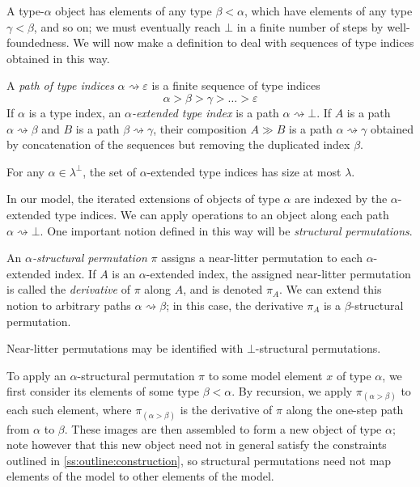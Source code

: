 A type-\( \alpha \) object has elements of any type \( \beta < \alpha \), which have elements of any type \( \gamma < \beta \), and so on; we must eventually reach \( \bot \) in a finite number of steps by well-foundedness.
We will now make a definition to deal with sequences of type indices obtained in this way.
\begin{definition}
    A \emph{path of type indices} \( \alpha \rightsquigarrow \varepsilon \) is a finite sequence of type indices
    \[ \alpha > \beta > \gamma > \dots > \varepsilon \]
    If \( \alpha \) is a type index, an \emph{\( \alpha \)-extended type index} is a path \( \alpha \rightsquigarrow \bot \).
    If \( A \) is a path \( \alpha \rightsquigarrow \beta \) and \( B \) is a path \( \beta \rightsquigarrow \gamma \), their composition \( A \gg B \) is a path \( \alpha \rightsquigarrow \gamma \) obtained by concatenation of the sequences but removing the duplicated index \( \beta \).
\end{definition}
\begin{remark}
    \label{rk:mk_extended_index}
    For any \( \alpha \in \lambda^\bot \), the set of \( \alpha \)-extended type indices has size at most \( \lambda \).
\end{remark}
In our model, the iterated extensions of objects of type \( \alpha \) are indexed by the \( \alpha \)-extended type indices.
We can apply operations to an object along each path \( \alpha \rightsquigarrow \bot \).
One important notion defined in this way will be \emph{structural permutations}.
\begin{definition}
    An \emph{\( \alpha \)-structural permutation} \( \pi \) assigns a near-litter permutation to each \( \alpha \)-extended index.
    If \( A \) is an \( \alpha \)-extended index, the assigned near-litter permutation is called the \emph{derivative} of \( \pi \) along \( A \), and is denoted \( \pi_A \).
    We can extend this notion to arbitrary paths \( \alpha \rightsquigarrow \beta \); in this case, the derivative \( \pi_A \) is a \( \beta \)-structural permutation.
\end{definition}
\begin{remark}
    Near-litter permutations may be identified with \( \bot \)-structural permutations.
\end{remark}
To apply an \( \alpha \)-structural permutation \( \pi \) to some model element \( x \) of type \( \alpha \), we first consider its elements of some type \( \beta < \alpha \).
By recursion, we apply \( \pi_{(\alpha > \beta)} \) to each such element, where \( \pi_{(\alpha > \beta)} \) is the derivative of \( \pi \) along the one-step path from \( \alpha \) to \( \beta \).
These images are then assembled to form a new object of type \( \alpha \); note however that this new object need not in general satisfy the constraints outlined in \cref{ss:outline:construction}, so structural permutations need not map elements of the model to other elements of the model.

